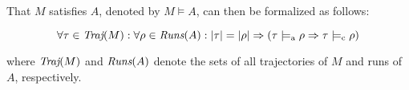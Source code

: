 That $M$ satisfies $A$, denoted by $M \models A$, can then be formalized as follows: %

\begin{equation*}
\forall \tau \in \operatorname{\textit{Traj}}(M) : \forall \rho \in \operatorname{\textit{Runs}}(A) : | \tau | = | \rho | \Rightarrow (\tau \models_{\textrm{a}} \rho \Rightarrow \tau \models_{\textrm{c}} \rho)
\end{equation*}

\noindent where $\operatorname{\textit{Traj}}(M)$ and $\operatorname{\textit{Runs}}(A)$ denote the sets of all trajectories of $M$ and runs of $A$, respectively. 






